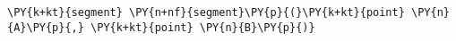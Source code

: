 \begin{Verbatim}[commandchars=\\\{\}]
    \PY{k+kt}{segment} \PY{n+nf}{segment}\PY{p}{(}\PY{k+kt}{point} \PY{n}{A}\PY{p}{,} \PY{k+kt}{point} \PY{n}{B}\PY{p}{)}
\end{Verbatim}
